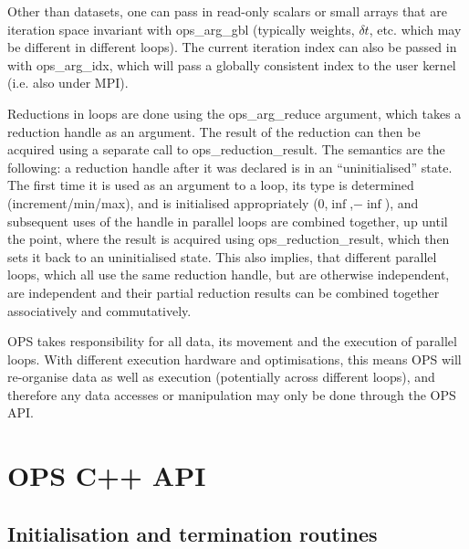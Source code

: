 \documentclass[11pt]{article}
\begin{document}
Other than datasets, one can pass in read-only scalars or small arrays that are iteration space invariant with ops\_arg\_gbl (typically weights, $\delta t$, etc. which may be different in different loops). The current iteration index can also be passed in with ops\_arg\_idx, which will pass a globally consistent index to the user kernel (i.e. also under MPI).

Reductions in loops are done using the ops\_arg\_reduce argument, which takes a reduction handle as an argument. The result of the reduction can then be acquired using a separate call to ops\_reduction\_result. The semantics are the following: a reduction handle after it was declared is in an ``uninitialised'' state. The first time it is used as an argument to a loop, its type is determined (increment/min/max), and is initialised appropriately (0,$\inf$,$-\inf$), and subsequent uses of the handle in parallel loops are combined together, up until the point, where the result is acquired using ops\_reduction\_result, which then sets it back to an uninitialised state. This also implies, that different parallel loops, which all use the same reduction handle, but are otherwise independent, are independent and their partial reduction results can be combined together associatively and commutatively. 

OPS takes responsibility for all data, its movement and the execution of parallel loops. With different execution hardware and optimisations, this means OPS will re-organise data as well as execution (potentially across different loops), and therefore any data accesses or manipulation may only be done through the OPS API.

\clearpage

\newpage
\section{OPS C++ API}

\subsection{Initialisation and termination routines}
\end{document}
